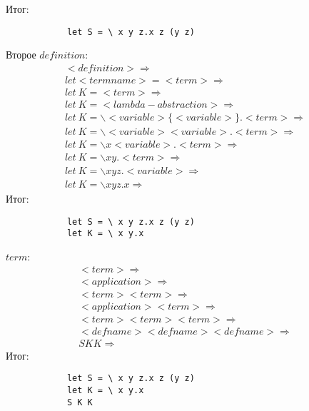 \documentclass[12pt]{article}
\begin{document}
    Итог:
        \begin{verbatim}
            let S = \ x y z.x z (y z)
        \end{verbatim}
    Второе $definition$:
        \begin{eqnarray}
            <definition>\Rightarrow \\
            let <termname> = <term> \Rightarrow \\
            let \  K = <term> \Rightarrow \\
            let \  K = <lambda-abstraction> \Rightarrow \\
            let \  K = \backslash<variable>\{<variable>\}.<term> \Rightarrow \\
            let \  K = \backslash<variable><variable>.<term> \Rightarrow \\
            let \  K = \backslash x <variable>.<term> \Rightarrow \\
            let \  K = \backslash x y.<term> \Rightarrow \\
            let \  K = \backslash x y z.<variable> \Rightarrow \\
            let \  K = \backslash x y z.x \Rightarrow
        \end{eqnarray}
    Итог:
        \begin{verbatim}
            let S = \ x y z.x z (y z)
            let K = \ x y.x
        \end{verbatim}
    $term$:
        \begin{eqnarray}
            <term>\Rightarrow \\
            <application> \Rightarrow \\
            <term> <term> \Rightarrow \\
            <application> <term>\Rightarrow \\
            <term> <term> <term> \Rightarrow \\
            <defname> <defname> <defname> \Rightarrow \\
            S K K \Rightarrow
        \end{eqnarray}
    Итог:
        \begin{verbatim}
            let S = \ x y z.x z (y z)
            let K = \ x y.x
            S K K
        \end{verbatim}
\end{document}
